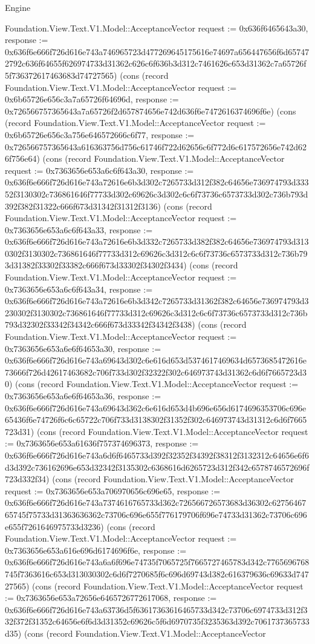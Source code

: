 \begin{lexlean}{Engine}
\begin{semanticmodule}
{Foundation.View.Text.V1.Model::AcceptanceVector {request := 0x636f6465643a30, response := 0x636f6e666f726d616e743a746965723d477269645175616e74697a656447656f6d657472792c636f64655f626974733d31362c626c6f636b3d312c7461626c653d31362c7a65726f5f736372617463683d74727565}) (cons (record Foundation.View.Text.V1.Model::AcceptanceVector {request := 0x6b65726e656c3a7a65726f64696d, response := 0x726566757365643a7a65726f2d657874656e742d636f6e7472616374696f6e}) (cons (record Foundation.View.Text.V1.Model::AcceptanceVector {request := 0x6b65726e656c3a756e646572666c6f77, response := 0x726566757365643a616363756d756c61746f722d62656c6f772d6c617572656e742d626f756e64}) (cons (record Foundation.View.Text.V1.Model::AcceptanceVector {request := 0x7363656e653a6c6f643a30, response := 0x636f6e666f726d616e743a72616e6b3d302c7265733d312f382c64656e736974793d33352f3130302c736861646f77733d302c69626c3d302c6c6f73736c6573733d302c736b793d392f382f31322c666f673d31342f31312f3136}) (cons (record Foundation.View.Text.V1.Model::AcceptanceVector {request := 0x7363656e653a6c6f643a33, response := 0x636f6e666f726d616e743a72616e6b3d332c7265733d382f382c64656e736974793d3130302f3130302c736861646f77733d312c69626c3d312c6c6f73736c6573733d312c736b793d31382f33302f33382c666f673d33302f34302f3434}) (cons (record Foundation.View.Text.V1.Model::AcceptanceVector {request := 0x7363656e653a6c6f643a34, response := 0x636f6e666f726d616e743a72616e6b3d342c7265733d31362f382c64656e736974793d3230302f3130302c736861646f77733d312c69626c3d312c6c6f73736c6573733d312c736b793d32302f33342f34342c666f673d33342f34342f3438}) (cons (record Foundation.View.Text.V1.Model::AcceptanceVector {request := 0x7363656e653a6e6f64653a30, response := 0x636f6e666f726d616e743a69643d302c6e616d653d5374617469634d6573685472616e73666f726d42617463682c706f733d302f32322f302c646973743d31362c6d6f7665723d30}) (cons (record Foundation.View.Text.V1.Model::AcceptanceVector {request := 0x7363656e653a6e6f64653a36, response := 0x636f6e666f726d616e743a69643d362c6e616d653d4b696e656d6174696353706c696e65436f6e74726f6c6c65722c706f733d3138302f31352f302c646973743d31312c6d6f7665723d31}) (cons (record Foundation.View.Text.V1.Model::AcceptanceVector {request := 0x7363656e653a61636f757374696373, response := 0x636f6e666f726d616e743a6d6f6465733d392f32352f34392f38312f3132312c64656e6f6d3d392c736162696e653d32342f3135302c6368616d6265723d312f342c6578746572696f723d332f34}) (cons (record Foundation.View.Text.V1.Model::AcceptanceVector {request := 0x7363656e653a706970656c696e65, response := 0x636f6e666f726d616e743a7374616765733d362c726566726573683d36302c6275646765745f75733d31363636362c73706c696e655f776179706f696e74733d31362c73706c696e655f7261646975733d3236}) (cons (record Foundation.View.Text.V1.Model::AcceptanceVector {request := 0x7363656e653a616e696d6174696f6e, response := 0x636f6e666f726d616e743a6a6f696e74735f7065725f7665727465783d342c7765696768745f7363616c653d313030302c6d6f7270685f6c696d69743d382c616379636c69633d74727565}) (cons (record Foundation.View.Text.V1.Model::AcceptanceVector {request := 0x7363656e653a72656e6465726772617068, response := 0x636f6e666f726d616e743a63736d5f63617363616465733d342c73706c6974733d312f332f372f31352c64656e6f6d3d31352c69626c5f6d6970735f3235363d392c7061737365733d35}) (cons (record Foundation.View.Text.V1.Model::AcceptanceVector }
\end{semanticmodule}
\end{lexlean}
